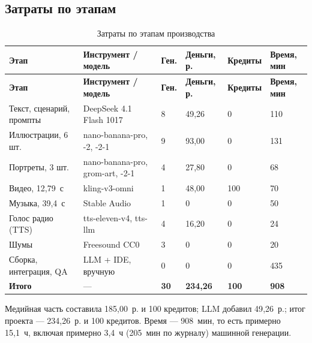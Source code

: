 \documentclass[12pt, a4paper]{article}
\begin{document}
\subsection{Затраты по этапам}
\begin{scriptsize}
\setlength{\tabcolsep}{3pt}
\begin{longtable}{@{}L{4.0cm}L{4.0cm}L{1.2cm}L{2.0cm}L{1.4cm}L{1.8cm}@{}}
\caption{Затраты по этапам производства}\label{tab:costs}\\
\toprule
\textbf{Этап} & \textbf{Инструмент / модель} & \textbf{Ген.} & \textbf{Деньги, р.} & \textbf{Кредиты} & \textbf{Время, мин} \\
\midrule
\endfirsthead
\toprule
\textbf{Этап} & \textbf{Инструмент / модель} & \textbf{Ген.} & \textbf{Деньги, р.} & \textbf{Кредиты} & \textbf{Время, мин} \\
\midrule
\endhead
\bottomrule
\endlastfoot
Текст, сценарий, промпты & DeepSeek 4.1 Flash 1017 & 8 & 49{,}26 & 0 & 110 \\
\addlinespace
Иллюстрации, 6 шт. & nano-banana-pro, -2, -2-1 & 9 & 93{,}00 & 0 & 131 \\
\addlinespace
Портреты, 3 шт. & nano-banana-pro, grom-art, -2-1 & 4 & 27{,}80 & 0 & 68 \\
\addlinespace
Видео, 12{,}79~с & kling-v3-omni & 1 & 48{,}00 & 100 & 70 \\
\addlinespace
Музыка, 39{,}4~с & Stable Audio & 1 & 0 & 0 & 50 \\
\addlinespace
Голос радио (TTS) & tts-eleven-v4, tts-llm & 4 & 16{,}20 & 0 & 24 \\
\addlinespace
Шумы & Freesound CC0 & 3 & 0 & 0 & 20 \\
\addlinespace
Сборка, интеграция, QA & LLM + IDE, вручную & 0 & 0 & 0 & 435 \\
\addlinespace
\textbf{Итого} & --- & \textbf{30} & \textbf{234{,}26} & \textbf{100} & \textbf{908} \\
\end{longtable}
\end{scriptsize}

Медийная часть составила 185{,}00~р. и 100 кредитов; LLM добавил 49{,}26~р.; итог проекта --- 234{,}26~р. и 100 кредитов. Время --- 908~мин, то есть примерно 15{,}1~ч, включая примерно 3{,}4~ч (205~мин по журналу) машинной генерации.
\end{document}
